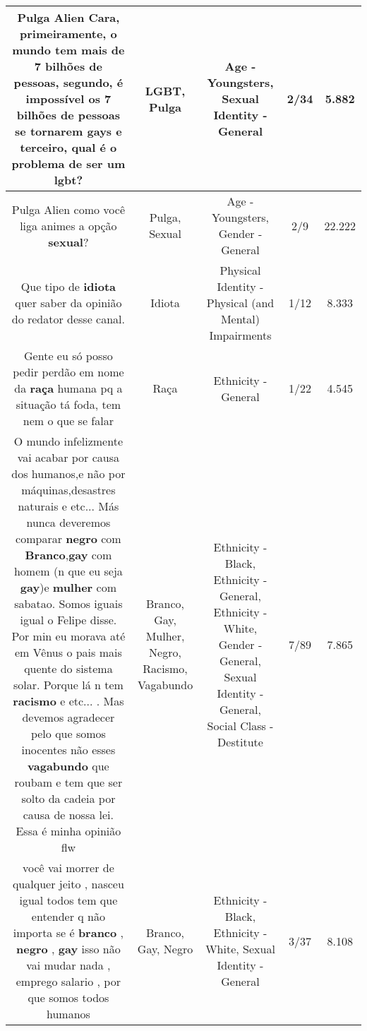 \documentclass[11pt]{article}
\newlength\mylength
\begin{document}
\begin{center}
\begin{longtable}{|C{.65\mylength}|C{.30\mylength}|C{.12\mylength}|C{.12\mylength}|C{.12\mylength}|}
  \small Pulga Alien  Cara, primeiramente, o mundo tem mais de 7 bilhões de pessoas, segundo, é impossível os  7 bilhões de pessoas se tornarem gays e terceiro, qual é o problema de ser um \textbf{lgbt}?\normalsize   & LGBT, Pulga & Age - Youngsters, Sexual Identity - General & 2/34 & 5.882 \\  \hline
  \small Pulga Alien  como você liga animes a opção \textbf{sexual}?\normalsize   & Pulga, Sexual & Age - Youngsters, Gender - General & 2/9 & 22.222 \\  \hline
  \small Que tipo de \textbf{idiota} quer saber da opinião do redator desse canal.\normalsize   & Idiota & Physical Identity - Physical (and Mental) Impairments & 1/12 & 8.333 \\  \hline
  \small Gente eu só posso pedir perdão em nome da \textbf{raça} humana pq a situação tá foda, tem nem o que se falar\normalsize   & Raça & Ethnicity - General & 1/22 & 4.545 \\  \hline
  \small O mundo infelizmente vai acabar por causa dos humanos,e não por máquinas,desastres naturais e etc... Más nunca deveremos comparar \textbf{negro} com \textbf{Branco},\textbf{gay} com homem (n que eu seja \textbf{gay})e \textbf{mulher} com sabatao. Somos iguais igual o Felipe disse. Por min eu morava até em Vênus o pais mais quente do sistema solar. Porque lá n tem \textbf{racismo} e etc... . Mas devemos agradecer pelo que somos inocentes não esses \textbf{vagabundo} que roubam e tem que ser solto da cadeia por causa de nossa lei. Essa é minha opinião flw\normalsize   & Branco, Gay, Mulher, Negro, Racismo, Vagabundo & Ethnicity - Black, Ethnicity - General, Ethnicity - White, Gender - General, Sexual Identity - General, Social Class - Destitute & 7/89 & 7.865 \\  \hline
  \small você vai morrer de qualquer jeito , nasceu igual todos tem que entender q não importa se é \textbf{branco} , \textbf{negro} , \textbf{gay} isso não vai mudar nada , emprego salario , por que somos todos humanos\normalsize   & Branco, Gay, Negro & Ethnicity - Black, Ethnicity - White, Sexual Identity - General & 3/37 & 8.108 \\  \hline

\end{longtable}
\end{center}
\end{document}
